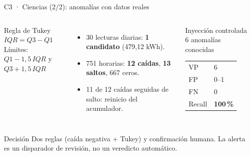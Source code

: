 \documentclass[aspectratio=169,10pt]{beamer}
\newcommand{\good}[1]{\textcolor{GoodGreen}{\textbf{#1}}}
\newcommand{\warn}[1]{\textcolor{WarnAmber}{\textbf{#1}}}
\begin{document}
\begin{frame}{C3 · Ciencias (2/2): anomalías con datos reales}
  \begin{columns}[T,onlytextwidth]
      \begin{block}{Regla de Tukey}
        $IQR = Q3 - Q1$\\
        Límites: $Q1 - 1{,}5\,IQR$ y $Q3 + 1{,}5\,IQR$
      \end{block}
      \begin{itemize}
        \item 30 lecturas diarias: \warn{1 candidato} (479,12 kWh).
        \item 751 horarias: \warn{12 caídas}, \warn{13 saltos}, 667 ceros.
        \item 11 de 12 caídas seguidas de salto: reinicio del acumulador.
      \end{itemize}
      \begin{block}{Inyección controlada}
        6 anomalías conocidas\\[1mm]
        \begin{tabular}{@{}ll@{}}
          VP & 6 \\
          FP & 0--1 \\
          FN & 0 \\
          Recall & \good{100\,\%} \\
        \end{tabular}
      \end{block}
  \end{columns}
  \vspace{1mm}
  \begin{block}{Decisión}
    Dos reglas (caída negativa + Tukey) y confirmación humana.
    La alerta es un disparador de revisión, no un veredicto automático.
  \end{block}
\end{frame}
\end{document}
